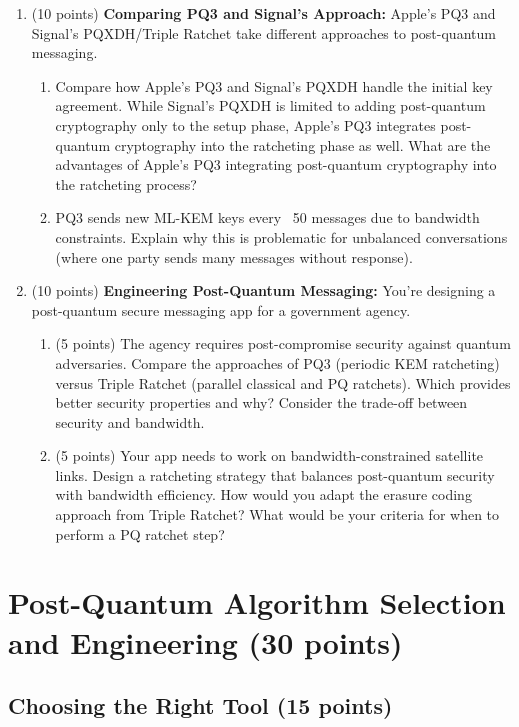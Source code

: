 \documentclass[10pt,a4paper,american]{exam}
\begin{document}
\begin{enumerate}
	\item (10 points) \textbf{Comparing PQ3 and Signal's Approach:}
	      Apple's PQ3 and Signal's PQXDH/Triple Ratchet take different approaches to post-quantum messaging.
	      \begin{enumerate}
		      \item Compare how Apple's PQ3 and Signal's PQXDH handle the initial key agreement. While Signal's PQXDH is limited to adding post-quantum cryptography only to the setup phase, Apple's PQ3 integrates post-quantum cryptography into the ratcheting phase as well. What are the advantages of Apple's PQ3 integrating post-quantum cryptography into the ratcheting process?
		      \item PQ3 sends new ML-KEM keys every ~50 messages due to bandwidth constraints. Explain why this is problematic for unbalanced conversations (where one party sends many messages without response).
	      \end{enumerate}
	\item (10 points) \textbf{Engineering Post-Quantum Messaging:}
	      You're designing a post-quantum secure messaging app for a government agency.
	      \begin{enumerate}
		      \item (5 points) The agency requires post-compromise security against quantum adversaries. Compare the approaches of PQ3 (periodic KEM ratcheting) versus Triple Ratchet (parallel classical and PQ ratchets). Which provides better security properties and why? Consider the trade-off between security and bandwidth.
		      \item (5 points) Your app needs to work on bandwidth-constrained satellite links. Design a ratcheting strategy that balances post-quantum security with bandwidth efficiency. How would you adapt the erasure coding approach from Triple Ratchet? What would be your criteria for when to perform a PQ ratchet step?
	      \end{enumerate}
\end{enumerate}

\section{Post-Quantum Algorithm Selection and Engineering (30 points)}

\subsection{Choosing the Right Tool (15 points)}
\end{document}
